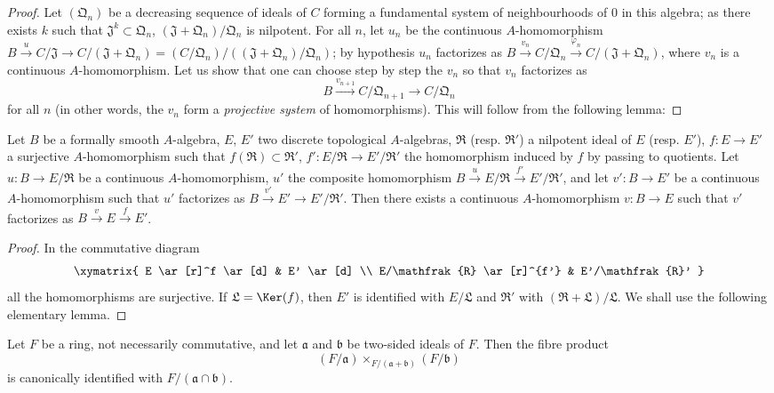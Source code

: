 \begin{proof}
Let $(\mathfrak{Q}_n)$ be a decreasing sequence of ideals of $C$ forming a fundamental system of neighbourhoods of $0$ in this algebra;
as there exists $k$ such that $\mathfrak{J}^k\subset\mathfrak{Q}_n$, $(\mathfrak{J}+\mathfrak{Q}_n)/\mathfrak{Q}_n$ is nilpotent.
For all $n$, let $u_n$ be the continuous $A$-homomorphism $B\xrightarrow{u}C/\mathfrak{J}\to C/(\mathfrak{J}+\mathfrak{Q}_n)=(C/\mathfrak{Q}_n)/((\mathfrak{J}+\mathfrak{Q}_n)/\mathfrak{Q}_n)$;
by hypothesis $u_n$ factorizes as $B\xrightarrow{v_n}C/\mathfrak{Q}_n\xrightarrow{\varphi_n}C/(\mathfrak{J}+\mathfrak{Q}_n)$, where $v_n$ is a continuous $A$-homomorphism.
Let us show that one can choose step by step the $v_n$ so that $v_n$ factorizes as
\[
  B\xrightarrow{v_{n+1}}C/\mathfrak{Q}_{n+1}\to C/\mathfrak{Q}_n
\]
for all $n$ (in other words, the $v_n$ form a \emph{projective system} of homomorphisms).
This will follow from the following lemma:
\end{proof}

\begin{lemma}[19.3.10.1]
\label{0.19.3.10.1}
Let $B$ be a formally smooth $A$-algebra, $E$, $E'$ two discrete topological $A$-algebras, $\mathfrak{R}$ (resp. $\mathfrak{R}'$) a nilpotent ideal of $E$ (resp. $E'$), $f:E\to E'$ a surjective $A$-homomorphism such that $f(\mathfrak{R})\subset\mathfrak{R}'$, $f':E/\mathfrak{R}\to E'/\mathfrak{R}'$ the homomorphism induced by $f$ by passing to quotients.
Let $u:B\to E/\mathfrak{R}$ be a continuous $A$-homomorphism, $u'$ the composite homomorphism $B\xrightarrow{u}E/\mathfrak{R}\xrightarrow{f'}E'/\mathfrak{R}'$, and let $v':B\to E'$ be a continuous $A$-homomorphism such that $u'$ factorizes as $B\xrightarrow{v'}E'\to E'/\mathfrak{R}'$.
Then there exists a continuous $A$-homomorphism $v:B\to E$ such that $v'$ factorizes as $B\xrightarrow{v}E\xrightarrow{f}E'$.
\end{lemma}

\begin{proof}
In the commutative diagram
\[
\xymatrix{
  E \ar[r]^f \ar[d] & E' \ar[d] \\
  E/\mathfrak{R} \ar[r]^{f'} & E'/\mathfrak{R}'
}
\]
all the homomorphisms are surjective.
If $\mathfrak{L}=\Ker(f)$, then $E'$ is identified with $E/\mathfrak{L}$ and $\mathfrak{R}'$ with $(\mathfrak{R}+\mathfrak{L})/\mathfrak{L}$.
We shall use the following elementary lemma.
\end{proof}

\begin{lemma}[19.3.10.2]
\label{0.19.3.10.2}
Let $F$ be a ring, not necessarily commutative, and let $\mathfrak{a}$ and $\mathfrak{b}$ be two-sided ideals of $F$.
Then the fibre product
\[
  (F/\mathfrak{a})\times_{F/(\mathfrak{a}+\mathfrak{b})}(F/\mathfrak{b})
\]
is canonically identified with $F/(\mathfrak{a}\cap\mathfrak{b})$.
\end{lemma}

